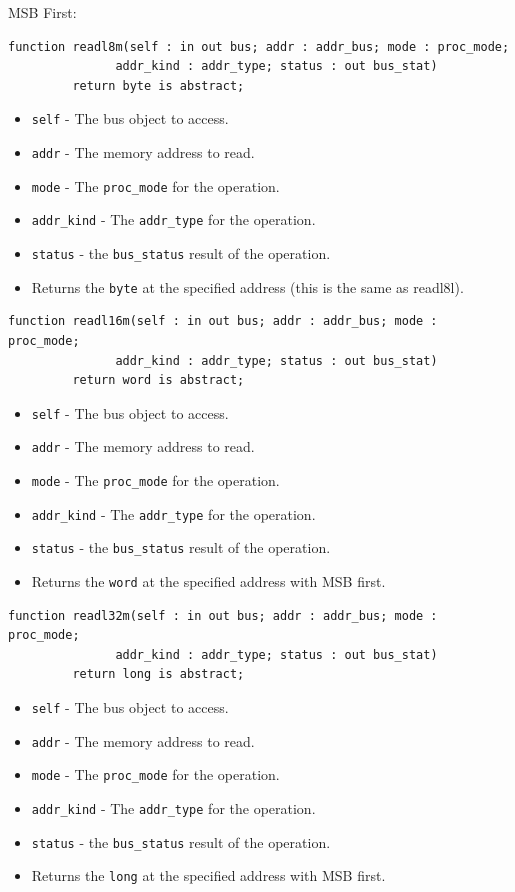 \documentclass[10pt, openany]{book}
\newcommand{\keyword}[1]{\texttt{#1}}
\newcommand{\datatype}[1]{\texttt{#1}}
\begin{document}
MSB First:
\begin{lstlisting}
function readl8m(self : in out bus; addr : addr_bus; mode : proc_mode;
               addr_kind : addr_type; status : out bus_stat)
         return byte is abstract;
\end{lstlisting}
\begin{itemize}
  \item \keyword{self} - The bus object to access.
  \item \keyword{addr} - The memory address to read.
  \item \keyword{mode} - The \datatype{proc\_mode} for the operation.
  \item \keyword{addr\_kind} - The \datatype{addr\_type} for the operation.
  \item \keyword{status} - the \datatype{bus\_status} result of the operation.
  \item Returns the \datatype{byte} at the specified address (this is the same as readl8l).
\end{itemize}

\begin{lstlisting}
function readl16m(self : in out bus; addr : addr_bus; mode : proc_mode;
               addr_kind : addr_type; status : out bus_stat)
         return word is abstract;
\end{lstlisting}
\begin{itemize}
  \item \keyword{self} - The bus object to access.
  \item \keyword{addr} - The memory address to read.
  \item \keyword{mode} - The \datatype{proc\_mode} for the operation.
  \item \keyword{addr\_kind} - The \datatype{addr\_type} for the operation.
  \item \keyword{status} - the \datatype{bus\_status} result of the operation.
  \item Returns the \datatype{word} at the specified address with MSB first.
\end{itemize}

\begin{lstlisting}
function readl32m(self : in out bus; addr : addr_bus; mode : proc_mode;
               addr_kind : addr_type; status : out bus_stat)
         return long is abstract;
\end{lstlisting}
\begin{itemize}
  \item \keyword{self} - The bus object to access.
  \item \keyword{addr} - The memory address to read.
  \item \keyword{mode} - The \datatype{proc\_mode} for the operation.
  \item \keyword{addr\_kind} - The \datatype{addr\_type} for the operation.
  \item \keyword{status} - the \datatype{bus\_status} result of the operation.
  \item Returns the \datatype{long} at the specified address with MSB first.
\end{itemize}
\end{document}
